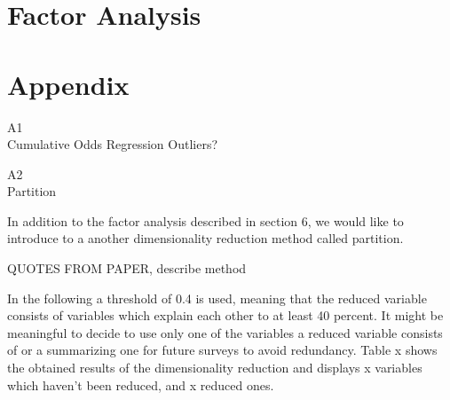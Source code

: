 \documentclass[12pt, a4paper]{article}\usepackage[]{graphicx}\usepackage[]{color}
\begin{document}
\section{Factor Analysis}

\section{Appendix}

A1\\ 
Cumulative Odds Regression 
Outliers? 



A2\\
Partition 

In addition to the factor analysis described in section 6, we would like to introduce to a another dimensionality reduction method called partition. 

QUOTES FROM PAPER, describe method 

In the following a threshold of 0.4 is used, meaning that the reduced variable consists of variables which explain each other to at least 40 percent. It might be meaningful to decide to use only one of the variables a reduced variable consists of or a summarizing one for future surveys to avoid redundancy. Table x shows the obtained results of the dimensionality reduction and displays x variables which haven't been reduced, and x reduced ones.    
\end{document}
